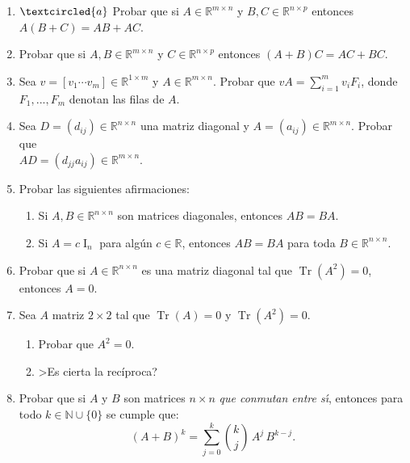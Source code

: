 \documentclass[12pt]{amsart}
\begin{document}
\begin{enumerate}[resume, topsep=5pt,itemsep=5pt]

\item\label{ej: distributiva} $\textcircled{a}$ Probar que si $A\in\mathbb{R}^{m\times n}$ y $B,C\in\mathbb{R}^{n\times p}$ entonces
$A(B+ C)=AB + AC$.

\item Probar que si $A,B\in\mathbb{R}^{m\times n}$ y $C\in\mathbb{R}^{n\times p}$ entonces
$(A+B)C = AC + BC$.

\item Sea $v=[v_1 \cdots v_m]\in\mathbb{R}^{1\times m}$ y $A\in\mathbb{R}^{m\times n}$. Probar que $vA=\sum_{i=1}^m v_iF_i$, donde $F_1, ..., F_m$ denotan las filas de $A$.

\item Sea $D=(d_{ij})\in\mathbb{R}^{n\times n}$ una matriz diagonal y $A=(a_{ij})\in\mathbb{R}^{m\times n}$. Probar que \\ $AD=(d_{jj}a_{ij})\in\mathbb{R}^{m\times n}$.

\item
Probar las siguientes afirmaciones:
\begin{enumerate}[topsep=5pt,itemsep=5pt]
\item Si $A,B\in\mathbb{R}^{n\times n}$ son matrices diagonales, entonces $AB=BA$.
\item Si $A=c \operatorname{I}_n$ para alg\'un $c \in \mathbb{R}$, entonces $AB=BA$ para toda $B\in\mathbb{R}^{n\times n}$.
\end{enumerate}

\item Probar que si $A\in\mathbb{R}^{n\times n}$ es una matriz diagonal tal que $\operatorname{Tr} (A^2)=0$, entonces $A=0$.

\item Sea $A$ matriz $2\times 2$  tal que $\operatorname{Tr}(A)=0$ y $\operatorname{Tr}(A^2)=0$.

\begin{enumerate}[topsep=5pt,itemsep=5pt]
	\item  Probar que $A^2 = 0$.
	\item   >Es cierta la rec\'iproca?
\end{enumerate}


\item Probar que si $A$ y $B$ son matrices $n \times n$ \emph{que conmutan entre s\' \i}, entonces para todo $k \in \mathbb N \cup \{0\}$ se cumple que:
$$(A+B)^k = \sum_{j = 0}^k \binom{k}{j} \, A^j \, B^{k-j}.$$


\end{enumerate}
\end{document}
